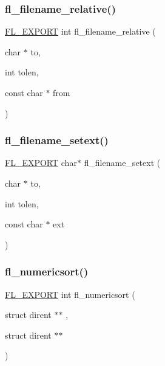 \subsubsection{\texorpdfstring{fl\+\_\+filename\+\_\+relative()}{fl\_filename\_relative()}}
{\footnotesize\ttfamily \hyperlink{_fl___export_8_h_aa9ba29a18aee9d738370a06eeb4470fc}{F\+L\+\_\+\+E\+X\+P\+O\+RT} int fl\+\_\+filename\+\_\+relative (\begin{DoxyParamCaption}\item[{char $\ast$}]{to,  }\item[{int}]{tolen,  }\item[{const char $\ast$}]{from }\end{DoxyParamCaption})}

\mbox{\label{group__filenames_ga957325ab216ec3290693a737ac8881a3}} 
\subsubsection{\texorpdfstring{fl\+\_\+filename\+\_\+setext()}{fl\_filename\_setext()}}
{\footnotesize\ttfamily \hyperlink{_fl___export_8_h_aa9ba29a18aee9d738370a06eeb4470fc}{F\+L\+\_\+\+E\+X\+P\+O\+RT} char$\ast$ fl\+\_\+filename\+\_\+setext (\begin{DoxyParamCaption}\item[{char $\ast$}]{to,  }\item[{int}]{tolen,  }\item[{const char $\ast$}]{ext }\end{DoxyParamCaption})}

\mbox{\label{group__filenames_ga2800a56e49038e2707b16e7fc340242a}} 
\subsubsection{\texorpdfstring{fl\+\_\+numericsort()}{fl\_numericsort()}}
{\footnotesize\ttfamily \hyperlink{_fl___export_8_h_aa9ba29a18aee9d738370a06eeb4470fc}{F\+L\+\_\+\+E\+X\+P\+O\+RT} int fl\+\_\+numericsort (\begin{DoxyParamCaption}\item[{struct dirent $\ast$$\ast$}]{,  }\item[{struct dirent $\ast$$\ast$}]{ }\end{DoxyParamCaption})}

